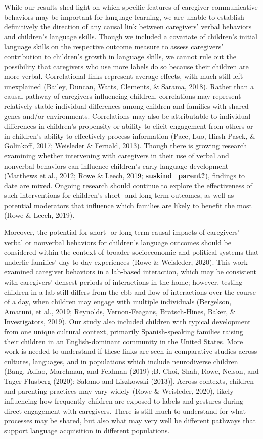\documentclass[
  man,floatsintext]{apa6}
\begin{document}
While our results shed light on which specific features of caregiver communicative behaviors may be important for language learning, we are unable to establish definitively the direction of any causal link between caregivers' verbal behaviors and children's language skills. Though we included a covariate of children's initial language skills on the respective outcome measure to assess caregivers' contribution to children's growth in language skills, we cannot rule out the possibility that caregivers who use more labels do so because their children are more verbal. Correlational links represent average effects, with much still left unexplained (Bailey, Duncan, Watts, Clements, \& Sarama, 2018). Rather than a causal pathway of caregivers influencing children, correlations may represent relatively stable individual differences among children and families with shared genes and/or environments. Correlations may also be attributable to individual differences in children's propensity or ability to elicit engagement from others or in children's ability to effectively process information (Pace, Luo, Hirsh-Pasek, \& Golinkoff, 2017; Weisleder \& Fernald, 2013). Though there is growing research examining whether intervening with caregivers in their use of verbal and nonverbal behaviors can influence children's early language development (Matthews et al., 2012; Rowe \& Leech, 2019; \textbf{suskind\_parent?}), findings to date are mixed. Ongoing research should continue to explore the effectiveness of such interventions for children's short- and long-term outcomes, as well as potential moderators that influence which families are likely to benefit the most (Rowe \& Leech, 2019).

Moreover, the potential for short- or long-term causal impacts of caregivers' verbal or nonverbal behaviors for children's language outcomes should be considered within the context of broader socioeconomic and political systems that underlie families' day-to-day experiences (Rowe \& Weisleder, 2020). This work examined caregiver behaviors in a lab-based interaction, which may be consistent with caregivers' densest periods of interactions in the home; however, testing children in a lab still differs from the ebb and flow of interactions over the course of a day, when children may engage with multiple individuals (Bergelson, Amatuni, et al., 2019; Reynolds, Vernon-Feagans, Bratsch-Hines, Baker, \& Investigators, 2019). Our study also included children with typical development from one unique cultural context, primarily Spanish-speaking families raising their children in an English-dominant community in the United States. More work is needed to understand if these links are seen in comparative studies across cultures, languages, and in populations which include neurodiverse children (Bang, Adiao, Marchman, and Feldman (2019) ;B. Choi, Shah, Rowe, Nelson, and Tager-Flusberg (2020); Salomo and Liszkowski (2013){]}. Across contexts, children and parenting practices may vary widely (Rowe \& Weisleder, 2020), likely influencing how frequently children are exposed to labels and gestures during direct engagement with caregivers. There is still much to understand for what processes may be shared, but also what may very well be different pathways that support language acquisition in different populations.
\end{document}
